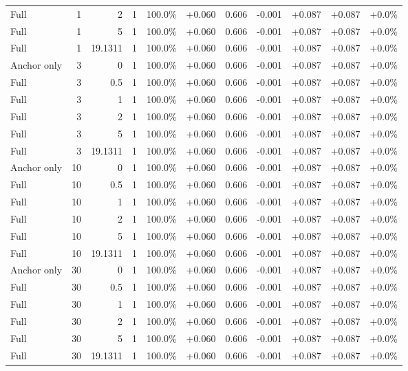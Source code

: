 \begin{table}[htbp]
\begin{tabular}{lrrrccccccc}
Full & 1 & 2 & 1 & 100.0\% & +0.060 & 0.606 & -0.001 & +0.087 & +0.087 & +0.0\% \\
Full & 1 & 5 & 1 & 100.0\% & +0.060 & 0.606 & -0.001 & +0.087 & +0.087 & +0.0\% \\
Full & 1 & 19.1311 & 1 & 100.0\% & +0.060 & 0.606 & -0.001 & +0.087 & +0.087 & +0.0\% \\
Anchor only & 3 & 0 & 1 & 100.0\% & +0.060 & 0.606 & -0.001 & +0.087 & +0.087 & +0.0\% \\
Full & 3 & 0.5 & 1 & 100.0\% & +0.060 & 0.606 & -0.001 & +0.087 & +0.087 & +0.0\% \\
Full & 3 & 1 & 1 & 100.0\% & +0.060 & 0.606 & -0.001 & +0.087 & +0.087 & +0.0\% \\
Full & 3 & 2 & 1 & 100.0\% & +0.060 & 0.606 & -0.001 & +0.087 & +0.087 & +0.0\% \\
Full & 3 & 5 & 1 & 100.0\% & +0.060 & 0.606 & -0.001 & +0.087 & +0.087 & +0.0\% \\
Full & 3 & 19.1311 & 1 & 100.0\% & +0.060 & 0.606 & -0.001 & +0.087 & +0.087 & +0.0\% \\
Anchor only & 10 & 0 & 1 & 100.0\% & +0.060 & 0.606 & -0.001 & +0.087 & +0.087 & +0.0\% \\
Full & 10 & 0.5 & 1 & 100.0\% & +0.060 & 0.606 & -0.001 & +0.087 & +0.087 & +0.0\% \\
Full & 10 & 1 & 1 & 100.0\% & +0.060 & 0.606 & -0.001 & +0.087 & +0.087 & +0.0\% \\
Full & 10 & 2 & 1 & 100.0\% & +0.060 & 0.606 & -0.001 & +0.087 & +0.087 & +0.0\% \\
Full & 10 & 5 & 1 & 100.0\% & +0.060 & 0.606 & -0.001 & +0.087 & +0.087 & +0.0\% \\
Full & 10 & 19.1311 & 1 & 100.0\% & +0.060 & 0.606 & -0.001 & +0.087 & +0.087 & +0.0\% \\
Anchor only & 30 & 0 & 1 & 100.0\% & +0.060 & 0.606 & -0.001 & +0.087 & +0.087 & +0.0\% \\
Full & 30 & 0.5 & 1 & 100.0\% & +0.060 & 0.606 & -0.001 & +0.087 & +0.087 & +0.0\% \\
Full & 30 & 1 & 1 & 100.0\% & +0.060 & 0.606 & -0.001 & +0.087 & +0.087 & +0.0\% \\
Full & 30 & 2 & 1 & 100.0\% & +0.060 & 0.606 & -0.001 & +0.087 & +0.087 & +0.0\% \\
Full & 30 & 5 & 1 & 100.0\% & +0.060 & 0.606 & -0.001 & +0.087 & +0.087 & +0.0\% \\
Full & 30 & 19.1311 & 1 & 100.0\% & +0.060 & 0.606 & -0.001 & +0.087 & +0.087 & +0.0\% \\

\end{tabular}
\end{table}

